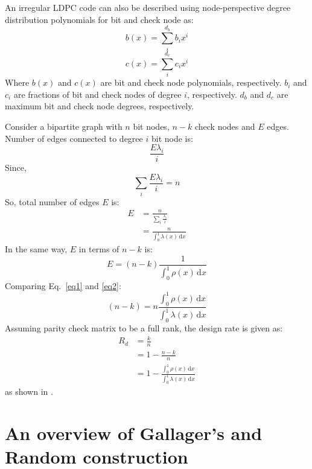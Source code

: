 An irregular LDPC code can also be described using node-perspective degree distribution polynomials for bit and check node as:
\begin{equation*}
 b(x)=\sum_i^{d_b}b_ix^{i}
\end{equation*}
%
\begin{equation*}
 c(x)=\sum_i^{d_c} c_ix^{i}
\end{equation*}
%
Where $b(x)$ and $c(x)$ are bit and check node polynomials, respectively. $b_i$ and $c_i$ are fractions of bit and check nodes of degree $i$, respectively. $d_b$ and $d_c$ are maximum bit and check node degrees, respectively.

Consider a bipartite graph with $n$ bit nodes, $n-k$ check nodes and $E$ edges. Number of edges connected to degree $i$ bit node is:
\begin{equation*}
 \frac{E\lambda_i}{i}
\end{equation*}
%
Since,
\begin{equation*}
 \sum_i \frac{E\lambda_i}{i}=n
\end{equation*}
%
So, total number of edges $E$ is:
\begin{align}
 E&=\frac{n}{\sum_i\frac{\lambda_i}{i}}\nonumber\\
 &=\frac{n}{\int_0^1 \lambda(x)\,\mathrm{d}x}\label{eq1}
\end{align}
%
In the same way, $E$ in terms of $n-k$ is:
\begin{equation}
 E=(n-k) \frac{1}{\int_0^1 \rho(x)\,\mathrm{d}x}\label{eq2}
\end{equation}
%
Comparing Eq.~\eqref{eq1} and \eqref{eq2}:
\begin{equation*}
(n-k)= n \frac{\int_0^1\rho(x)\,\mathrm{d}x}{\int_0^1\lambda(x)\,\mathrm{d}x}
\end{equation*}
%
Assuming parity check matrix to be a full rank, the design rate is given as:
\begin{align}
 R_d&=\frac{k}{n}\nonumber\\
 &=1-\frac{n-k}{n}\nonumber\\
 &=1-\frac{\int_0^1 \rho(x)\,\mathrm{d}x}{\int_0^1 \lambda(x) \,\mathrm{d}x}
\end{align}
%
as shown in \cite{irrldpc}.

\section{An overview of Gallager's and Random construction}
